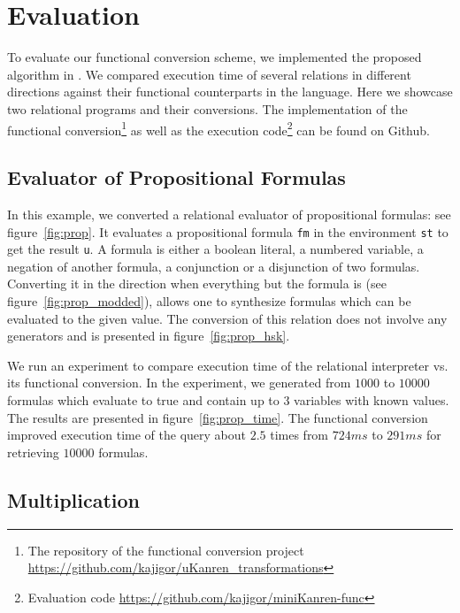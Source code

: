 \section{Evaluation}

To evaluate our functional conversion scheme, we implemented the proposed algorithm in \haskell.
We compared execution time of several \ocanren relations in different directions against their functional counterparts in the \ocaml language.
Here we showcase two relational programs and their conversions.
The implementation of the functional conversion\footnote{The repository of the functional conversion project \url{https://github.com/kajigor/uKanren_transformations}} as well as the execution code\footnote{Evaluation code \url{https://github.com/kajigor/miniKanren-func}} can be found on Github.



\subsection{Evaluator of Propositional Formulas}

In this example, we converted a relational evaluator of propositional formulas: see figure~\ref{fig:prop}.
It evaluates a propositional formula \lstinline{fm} in the environment \lstinline{st} to get the result \lstinline{u}.
A formula is either a boolean literal, a numbered variable, a negation of another formula, a conjunction or a disjunction of two formulas.
Converting it in the direction when everything but the formula is \inm (see figure~\ref{fig:prop_modded}), allows one to synthesize formulas which can be evaluated to the given value.
The conversion of this relation does not involve any generators and is presented in figure~\ref{fig:prop_hsk}.

We run an experiment to compare execution time of the relational interpreter vs. its functional conversion.
In the experiment, we generated from $1000$ to $10000$ formulas which evaluate to true and contain up to $3$ variables with known values.
The results are presented in figure~\ref{fig:prop_time}.
The functional conversion improved execution time of the query about $2.5$ times from $724ms$ to $291ms$ for retrieving $10000$ formulas.

 



\subsection{Multiplication}

